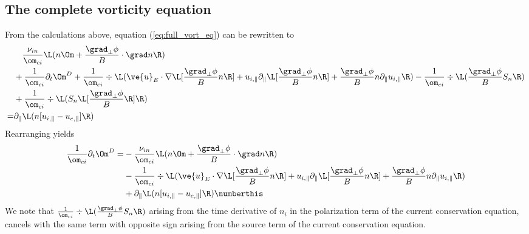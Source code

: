 \subsection{The complete vorticity equation}
%
From the calculations above, equation (\ref{eq:full_vort_eq}) can be rewritten
to
%
\begin{align*}
  &
  \quad
 \frac{\nu_{in}}{\om_{ci}} \L(n\Om + \frac{\grad_\perp \phi}{B} \cdot \grad n\R)
  \\
 &
 + \frac{1}{\om_{ci}} \partial_t \Om^D
 + \frac{1}{\om_{ci}} \div
 \L(
 \ve{u}_E\cdot\nabla \L[\frac{\grad_\perp \phi}{B}n \R]
 + u_{i,\|}\partial_\|\L[\frac{\grad_\perp \phi}{B}n\R]
 + \frac{\grad_\perp \phi}{B} n \partial_\| u_{i,\|}
 \R)
 - \frac{1}{\om_{ci}} \div\L( \frac{\grad_\perp \phi}{B} S_{n} \R)
 \\
 &
 + \frac{1}{\om_{ci}}
    \div \L( S_n \L[ \frac{ \grad_\perp \phi }{ B } \R] \R)
 \\
 =&
 \partial_\| \L(n [u_{i,\|} - u_{e,\|}]\R)
\end{align*}
%
Rearranging yields
%
\begin{align*}
  \frac{1}{\om_{ci}}
  \partial_t \Om^D
  =&
  - \frac{\nu_{in}}{\om_{ci}} \L(n\Om + \frac{\grad_\perp \phi}{B} \cdot \grad n\R)
  \\
  &
  - \frac{1}{\om_{ci}} \div
 \L(
 \ve{u}_E\cdot\nabla \L[\frac{\grad_\perp \phi}{B}n \R]
 + u_{i,\|}\partial_\|\L[\frac{\grad_\perp \phi}{B}n\R]
 + \frac{\grad_\perp \phi}{B} n \partial_\| u_{i,\|}
 \R)
 \\
 &
 + \partial_\| \L(n [u_{i,\|} - u_{e,\|}]\R)
 \numberthis
 \label{eq:non_norm_vort_1}
\end{align*}
%
We note that $\frac{1}{\om_{ci}} \div\L( \frac{\grad_\perp \phi}{B} S_{n} \R)$
arising from the time derivative of $n_i$ in the polarization term of the
current conservation equation, cancels with the same term with opposite sign
arising from the source term of the current conservation equation.

